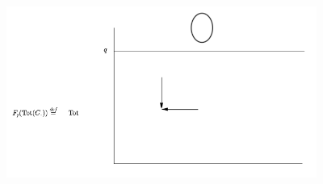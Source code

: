 \begin{figure}[h] 
   \centering
   \includegraphics[width=4in]{images/final.png} 
\end{figure}














